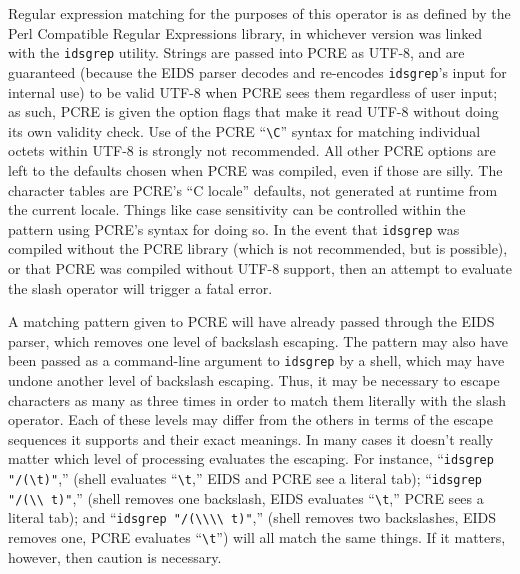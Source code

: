 \documentclass[twocolumn]{report}
\begin{document}
Regular expression matching for the purposes of this operator is as
defined by the Perl Compatible Regular Expressions library, in
whichever version was linked with the \texttt{idsgrep} utility.
Strings are passed into PCRE as UTF-8, and are guaranteed (because the
EIDS parser decodes and re-encodes \texttt{idsgrep}'s input for
internal use) to be valid UTF-8 when PCRE sees them regardless of user
input; as such, PCRE is given the option flags that make it read UTF-8
without doing its own validity check.  Use of the PCRE
``\texttt{\textbackslash C}'' syntax for matching individual octets
within UTF-8 is strongly not recommended. All other PCRE options are
left to the defaults chosen when PCRE was compiled, even if those are
silly.  The character tables are PCRE's ``C locale'' defaults, not
generated at runtime from the current locale. Things like case
sensitivity can be controlled within the pattern using PCRE's syntax
for doing so.  In the event that \texttt{idsgrep} was compiled without
the PCRE library (which is not recommended, but is possible), or that
PCRE was compiled without UTF-8 support, then an attempt to evaluate
the slash operator will trigger a fatal error.

A matching pattern given to PCRE will have already passed through the
EIDS parser, which removes one level of backslash escaping.  The
pattern may also have been passed as a command-line argument to
\texttt{idsgrep} by a shell, which may have undone another level of
backslash escaping.  Thus, it may be necessary to escape characters as
many as three times in order to match them literally with the slash
operator.  Each of these levels may differ from the others in terms of
the escape sequences it supports and their exact meanings.  In many
cases it doesn't really matter which level of processing
evaluates the escaping.  For instance, ``\texttt{idsgrep
"/(\textbackslash t)"},'' (shell
evaluates ``\texttt{\textbackslash t},'' EIDS and PCRE see a literal tab);
``\texttt{idsgrep "/(\textbackslash\textbackslash
t)"},'' (shell removes one backslash, EIDS evaluates
``\texttt{\textbackslash t},'' PCRE sees a literal tab); and ``\texttt{idsgrep
"/(\textbackslash\textbackslash\textbackslash\textbackslash
t)"},'' (shell removes two backslashes, EIDS removes
one, PCRE evaluates ``\texttt{\textbackslash t}'') will all match the same
things.  If it matters, however, then caution is necessary.
\end{document}
